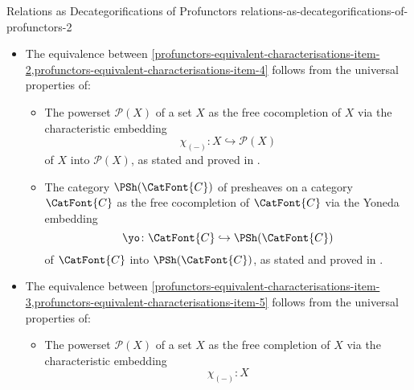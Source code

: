 \begin{remark}{Relations as Decategorifications of Profunctors \rmII}{relations-as-decategorifications-of-profunctors-2}
\begin{itemize}
\begin{align*}
                                                               &\cong \Fun(\CatFont{C},\PSh(\CatFont{D})).
            \end{align*}
        \item The equivalence between \cref{profunctors-equivalent-characterisations-item-2,profunctors-equivalent-characterisations-item-4} follows from the universal properties of:
            \begin{itemize}
                \item The powerset $\mathcal{P}(X)$ of a set $X$ as the free cocompletion of $X$ via the characteristic embedding
                    \[
                        \chi_{(-)}
                        \colon
                        X
                        \hookrightarrow
                        \mathcal{P}(X)
                    \]%
                    of $X$ into $\mathcal{P}(X)$, as stated and proved in .
                \item The category $\PSh(\CatFont{C})$ of presheaves on a category $\CatFont{C}$ as the free cocompletion of $\CatFont{C}$ via the Yoneda embedding
                    \[
                        \yo
                        \colon
                        \CatFont{C}
                        \hookrightarrow
                        \PSh(\CatFont{C})
                    \]%
                    of $\CatFont{C}$ into $\PSh(\CatFont{C})$, as stated and proved in .
            \end{itemize}
        \item The equivalence between \cref{profunctors-equivalent-characterisations-item-3,profunctors-equivalent-characterisations-item-5} follows from the universal properties of:
            \begin{itemize}
                \item The powerset $\mathcal{P}(X)$ of a set $X$ as the free completion of $X$ via the characteristic embedding
                    \[
                        \chi_{(-)}
                        \colon
                        X
\]
\end{itemize}
\end{itemize}
\end{remark}
